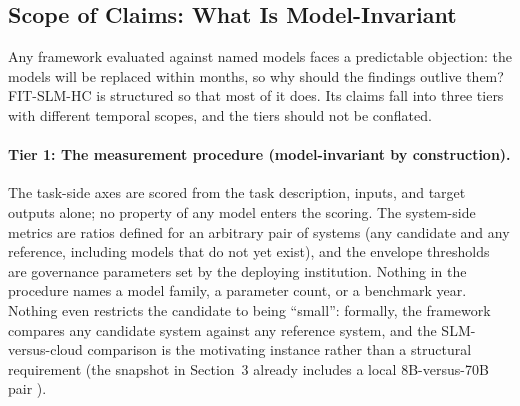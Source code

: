 \documentclass[11pt]{article}
\begin{document}
\subsection{Scope of Claims: What Is Model-Invariant}
\label{sec:scope}

Any framework evaluated against named models faces a predictable objection: the models will be replaced within months, so why should the findings outlive them? FIT-SLM-HC is structured so that most of it does. Its claims fall into three tiers with different temporal scopes, and the tiers should not be conflated.

\paragraph{Tier 1: The measurement procedure (model-invariant by construction).}
The task-side axes are scored from the task description, inputs, and target outputs alone; no property of any model enters the scoring. The system-side metrics are ratios defined for an arbitrary pair of systems (any candidate and any reference, including models that do not yet exist), and the envelope thresholds are governance parameters set by the deploying institution. Nothing in the procedure names a model family, a parameter count, or a benchmark year. Nothing even restricts the candidate to being ``small'': formally, the framework compares any candidate system against any reference system, and the SLM-versus-cloud comparison is the motivating instance rather than a structural requirement (the snapshot in Section~3 already includes a local 8B-versus-70B pair \cite{Builtjes2025}).
\end{document}
